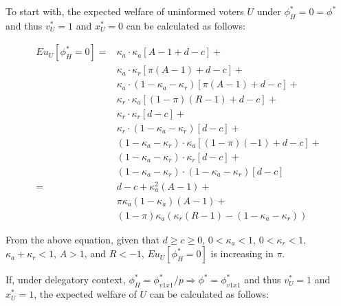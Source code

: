 \par To start with, the expected welfare of uninformed voters $U$ under $\phi^*_H=0=\phi^*$ and thus $v^*_U=1$ and $x^*_U=0$ can be calculated as follows:

\begin{align*}
	Eu_U[\phi^*_H=0] =& \kappa_a \cdot \kappa_a [ A - 1 + d - c] + \\
	&\kappa_a \cdot \kappa_r [ \pi(A-1) + d - c] + \\
	&\kappa_a \cdot (1-\kappa_a-\kappa_r) [ \pi(A-1) + d - c] + \\
	&\kappa_r \cdot \kappa_a [ (1-\pi)(R-1) + d - c] + \\
	&\kappa_r \cdot \kappa_r [ d - c ] + \\
	&\kappa_r \cdot (1-\kappa_a-\kappa_r) [ d - c ] + \\
	&(1-\kappa_a-\kappa_r) \cdot \kappa_a [ (1-\pi)(-1) + d - c] + \\
	&(1-\kappa_a-\kappa_r) \cdot \kappa_r [ d - c ] + \\
	&(1-\kappa_a-\kappa_r) \cdot (1-\kappa_a-\kappa_r) [ d - c ] \\
	=& d - c + \kappa_a^2 (A - 1) + \\
	&\pi \kappa_a (1-\kappa_a) (A-1) + \\ 
	&(1-\pi)\kappa_a (\kappa_r(R-1) - (1-\kappa_a-\kappa_r))
\end{align*}

\noindent From the above equation, given that $d \geq c\geq0$, $0<\kappa_a<1$, $0<\kappa_r<1$, $\kappa_a+\kappa_r<1$, $A>1$, and $R<-1$, $Eu_U[\phi^*_H=0]$ is increasing in $\pi$. 

\par If, under delegatory context, $\phi^*_H = \phi^*_{v1x1}/p \Rightarrow \phi^* = \phi^*_{v1x1}$ and thus $v^*_U=1$ and $x^*_U=1$, the expected welfare of $U$ can be calculated as follows:

